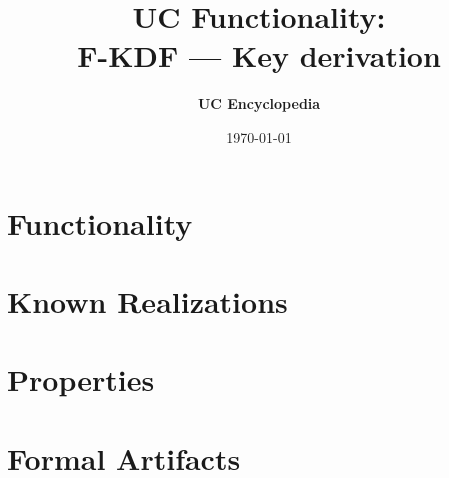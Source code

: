 \documentclass[11pt,a4paper]{article}
\title{\textbf{\Large UC Functionality:}\\[0.2em] \Large F-KDF --- Key derivation}
\author{\textbf{UC Encyclopedia}}
\date{\today}
\newtheorem{functionality}{Functionality}
\begin{document}
\maketitle

\begin{abstract}
\end{abstract}

\section{Functionality}

%

\section{Known Realizations}


\section{Properties}


\section{Formal Artifacts}

\end{document}
